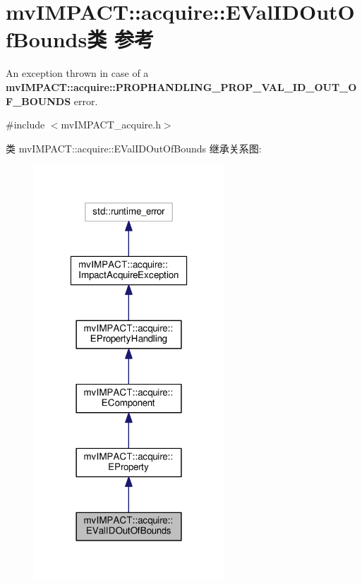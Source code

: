\hypertarget{classmv_i_m_p_a_c_t_1_1acquire_1_1_e_val_i_d_out_of_bounds}{\section{mv\+I\+M\+P\+A\+C\+T\+:\+:acquire\+:\+:E\+Val\+I\+D\+Out\+Of\+Bounds类 参考}
\label{classmv_i_m_p_a_c_t_1_1acquire_1_1_e_val_i_d_out_of_bounds}
}


An exception thrown in case of a {\bfseries mv\+I\+M\+P\+A\+C\+T\+::acquire\+::\+P\+R\+O\+P\+H\+A\+N\+D\+L\+I\+N\+G\+\_\+\+P\+R\+O\+P\+\_\+\+V\+A\+L\+\_\+\+I\+D\+\_\+\+O\+U\+T\+\_\+\+O\+F\+\_\+\+B\+O\+U\+N\+D\+S} error.  




{\ttfamily \#include $<$mv\+I\+M\+P\+A\+C\+T\+\_\+acquire.\+h$>$}



类 mv\+I\+M\+P\+A\+C\+T\+:\+:acquire\+:\+:E\+Val\+I\+D\+Out\+Of\+Bounds 继承关系图\+:
\nopagebreak
\begin{figure}[H]
\begin{center}
\leavevmode
\includegraphics[width=202pt]{classmv_i_m_p_a_c_t_1_1acquire_1_1_e_val_i_d_out_of_bounds__inherit__graph}
\end{center}
\end{figure}


